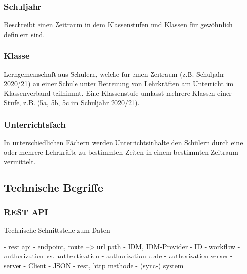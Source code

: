 \subsubsection*{Schuljahr}
Beschreibt einen Zeitraum in dem Klassenstufen und Klassen für gewöhnlich definiert sind.

\subsubsection*{Klasse}
Lerngemeinschaft aus Schülern, welche für einen Zeitraum (z.B. Schuljahr 2020/21) an einer Schule unter Betreuung von Lehrkräften am Unterricht im Klassenverband teilnimmt. Eine Klassenstufe umfasst mehrere Klassen einer Stufe, z.B. (5a, 5b, 5c im Schuljahr 2020/21).

\subsubsection*{Unterrichtsfach}
In unterschiedlichen Fächern werden Unterrichtsinhalte den Schülern durch eine oder mehrere Lehrkräfte zu bestimmten Zeiten in einem bestimmten Zeitraum vermittelt.  


\subsection{Technische Begriffe}

\subsubsection*{REST API}

Technische Schnittstelle zum Daten


- rest api 
- endpoint, route --> url path
- IDM, IDM-Provider
- ID
- workflow
- authorization vs. authentication 
- authorization code
- authorization server 
- server
- Client
- JSON
- rest, http methode
- (sync-) system
